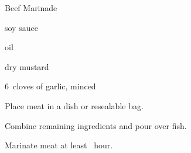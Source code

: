 \begin{recipe}{Beef Marinade}{}{}

\begin{ingredients}
\item {} 
\item \C{\half} soy sauce
\item \C{\quarter} oil
\item {} 
\item {} 
\item {} dry mustard
\item 6~cloves of garlic, minced
\end{ingredients}

\begin{directions}
\item Place meat in a dish or resealable bag.
\item Combine remaining ingredients and pour over fish.
\item Marinate meat at least \half~hour.
\end{directions}

\end{recipe}
